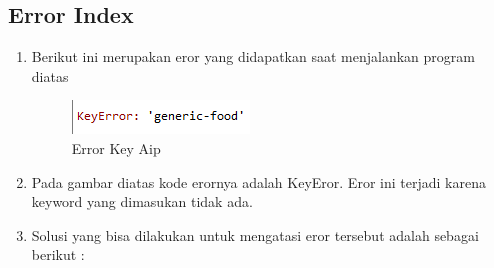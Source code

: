\subsection{Error Index}
\begin{enumerate}
	\item
Berikut ini merupakan eror yang didapatkan saat menjalankan program diatas
\begin{figure}[!hbtp]
\centering
\includegraphics[scale=0.5]{figures/AIP/errorc1.PNG}
\caption{Error Key Aip }
\label{Error}
\end{figure}
\item
Pada gambar diatas kode erornya adalah KeyEror. Eror ini terjadi karena keyword yang dimasukan tidak ada.
\item
Solusi yang bisa dilakukan untuk mengatasi eror tersebut adalah sebagai berikut : 
\end{enumerate}
